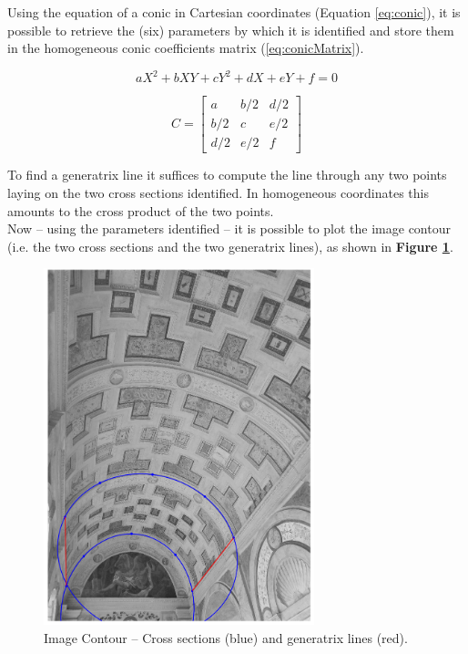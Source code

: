 \documentclass[12pt,a4paper]{article}
\begin{document}
Using the equation of a conic in Cartesian coordinates (Equation \ref{eq:conic}), it is possible to retrieve the (six) parameters by which it is identified and store them in the homogeneous conic coefficients matrix (\ref{eq:conicMatrix}).

\begin{equation}
    aX^2+bXY+cY^2+dX+eY+f=0
    \label{eq:conic}
\end{equation}

\begin{equation}
    C =
    \begin{bmatrix}
    a & b/2 & d/2\\
    b/2 & c & e/2\\
    d/2 & e/2 & f
    \end{bmatrix}
    \label{eq:conicMatrix}
\end{equation}
\bigskip

To find a generatrix line it suffices to compute the line through any two points laying on the two cross sections identified. In homogeneous coordinates this amounts to the cross product of the two points.\\

Now -- using the parameters identified -- it is possible to plot the image contour (i.e. the two cross sections and the two generatrix lines), as shown in \textbf{Figure \ref{fig:contour}}.

\begin{figure}[H]
    \centering
    \includegraphics[width=0.7\textwidth]{Images/PalazzoTe_contour.png}
    \caption[Image Contour -- Cross sections and generatrix lines.]{Image Contour -- Cross sections (blue) and generatrix lines (red).}
    \label{fig:contour}
\end{figure}
\end{document}
